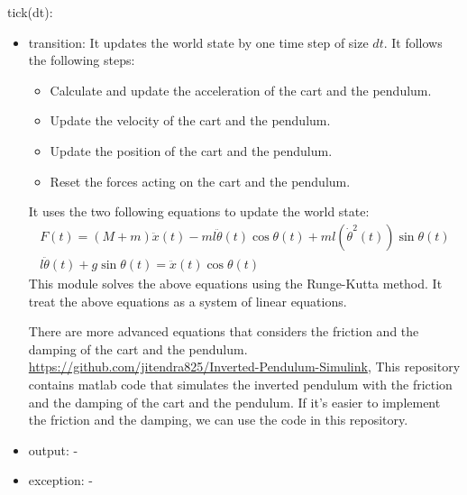 \documentclass[12pt, titlepage]{article}
\begin{document}
\noindent tick(dt):
\begin{itemize}
\item transition:
      It updates the world state by one time step of size $dt$.
      It follows the following steps:
      \begin{itemize}
        \item Calculate and update the acceleration of the cart and the pendulum.
        \item Update the velocity of the cart and the pendulum.
        \item Update the position of the cart and the pendulum.
        \item Reset the forces acting on the cart and the pendulum.
      \end{itemize}
      It uses the two following equations to update the world state:
      \begin{gather*}
        F(t) = (M+m)\ddot{x}(t) - ml\ddot{\theta}(t)\cos{\theta(t)} 
        + ml (\dot{\theta}^2(t)) \sin{\theta(t)} \\
        l \ddot{\theta}(t) + g \sin{\theta(t)} = \ddot{x}(t) \cos{\theta(t)}
      \end{gather*}
      This module solves the above equations using the Runge-Kutta method.
      It treat the above equations as a system of linear equations.

      There are more advanced equations that considers the friction and the
      damping of the cart and the pendulum.
      \url{https://github.com/jitendra825/Inverted-Pendulum-Simulink},
      This repository contains matlab code that simulates the inverted pendulum 
      with the friction and the damping of the cart and the pendulum. 
      If it's easier to implement the friction and the damping, we can use the
      code in this repository.
\item output: -
\item exception: -
\end{itemize}



\end{document}
